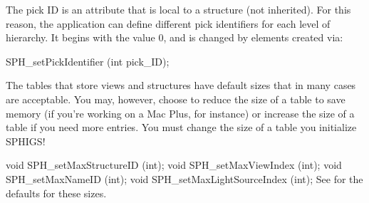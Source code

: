 \newpar
The pick ID is an attribute that is local to a structure (not
inherited).  For this reason, the application can define different
pick identifiers for each level of hierarchy.  It begins with the
value 0, and is changed by elements created via:

\begincode
SPH_setPickIdentifier (int pick_ID);  \elementgenerator
\endcode



The tables that store views and structures have default sizes that in many
cases are acceptable.  You may, however, choose to reduce the size of a table
to save memory (if you're working on a Mac Plus, for instance) or increase the
size of a table if you need more entries.  You must change the size of a table
 you initialize SPHIGS!

\newsynopsis
void SPH_setMaxStructureID (int);
void SPH_setMaxViewIndex (int);
void SPH_setMaxNameID (int);
void SPH_setMaxLightSourceIndex (int);
\endsynopsis
See  for the defaults for these sizes.


\bye


